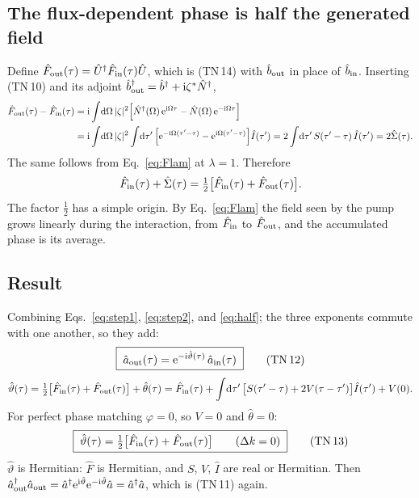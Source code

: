 \documentclass[aps,pra,onecolumn,notitlepage,11pt,amsmath,amssymb,nofootinbib]{revtex4-2}
\newcommand{\Nop}{\hat N}
\newcommand{\Iop}{\hat I}
\newcommand{\dd}{\mathrm{d}}
\newcommand{\ee}{\mathrm{e}}
\newcommand{\ii}{\mathrm{i}}
\newcommand{\TN}[1]{\text{TN\,#1}}
\begin{document}
\subsection{The flux-dependent phase is half the generated field}

Define $\hat F_{\rm out}(\tau)=\hat U^\dagger\hat F_{\rm in}(\tau)\hat U$, which
is (TN\,14) with $\hat b_{\rm out}$ in place of $\hat b_{\rm in}$. Inserting
(TN\,10) and its adjoint
$\hat b_{\rm out}^\dagger=\hat b^\dagger+\ii\zeta^*\Nop^\dagger$,
\begin{align}
\hat F_{\rm out}(\tau)-\hat F_{\rm in}(\tau)
&=\ii\int\!\dd\Omega\,|\zeta|^2\Big[\Nop^\dagger(\Omega)\,\ee^{\ii\Omega\tau}
-\Nop(\Omega)\,\ee^{-\ii\Omega\tau}\Big]\nonumber\\
&=\ii\int\!\dd\Omega\,|\zeta|^2\int\!\dd\tau'\,
\Big[\ee^{-\ii\Omega(\tau'-\tau)}-\ee^{\ii\Omega(\tau'-\tau)}\Big]\Iop(\tau')
=2\int\!\dd\tau'\,S(\tau'-\tau)\,\Iop(\tau')=2\hat\Sigma(\tau).
\label{eq:Fdiff}
\end{align}
The same follows from Eq.~\eqref{eq:Flam} at $\lambda=1$. Therefore
\begin{equation}
\hat F_{\rm in}(\tau)+\hat\Sigma(\tau)
=\tfrac12\big[\hat F_{\rm in}(\tau)+\hat F_{\rm out}(\tau)\big].
\label{eq:half}
\end{equation}
The factor $\tfrac12$ has a simple origin. By Eq.~\eqref{eq:Flam} the field
seen by the pump grows linearly during the interaction, from
$\hat F_{\rm in}$ to $\hat F_{\rm out}$, and the accumulated phase is its
average.

\subsection{Result}

Combining Eqs.~\eqref{eq:step1}, \eqref{eq:step2}, and \eqref{eq:half}; the
three exponents commute with one another, so they add:
\begin{equation}
\boxed{\;\hat a_{\rm out}(\tau)=\ee^{-\ii\hat\vartheta(\tau)}\,\hat a_{\rm in}(\tau)\;}
\tag{\TN{12}}
\end{equation}
\begin{equation}
\hat\vartheta(\tau)=\tfrac12\big[\hat F_{\rm in}(\tau)+\hat F_{\rm out}(\tau)\big]
+\hat\theta(\tau)
=\hat F_{\rm in}(\tau)+\int\!\dd\tau'\,\big[S(\tau'-\tau)+2V(\tau-\tau')\big]\Iop(\tau')+V(0).
\label{eq:varthetafull}
\end{equation}
For perfect phase matching $\varphi=0$, so $V=0$ and $\hat\theta=0$:
\begin{equation}
\boxed{\;\hat\vartheta(\tau)=\tfrac12\big[\hat F_{\rm in}(\tau)+\hat F_{\rm out}(\tau)\big]
\qquad(\Delta k=0)\;}
\tag{\TN{13}}
\end{equation}
$\hat\vartheta$ is Hermitian: $\hat F$ is Hermitian, and $S$, $V$, $\Iop$ are
real or Hermitian. Then
$\hat a_{\rm out}^\dagger\hat a_{\rm out}
=\hat a^\dagger\ee^{\ii\hat\vartheta}\ee^{-\ii\hat\vartheta}\hat a=\hat a^\dagger\hat a$,
which is (TN\,11) again.
\end{document}
